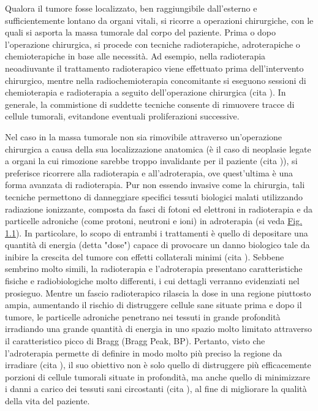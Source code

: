 \documentclass[12pt,a4paper,twoside]{report}
\begin{document}
	Qualora il tumore fosse localizzato, ben raggiungibile dall'esterno e sufficientemente lontano da organi vitali, si ricorre a operazioni chirurgiche, con le quali si asporta la massa tumorale dal corpo del paziente. Prima o dopo l'operazione chirurgica, si procede con tecniche radioterapiche, adroterapiche o chemioterapiche in base alle necessità. Ad esempio, nella radioterapia neoadiuvante il trattamento radioterapico viene effettuato prima dell'intervento chirurgico, mentre nella radiochemioterapia concomitante si eseguono sessioni di chemioterapia e radioterapia a seguito dell'operazione chirurgica (cita
	). In generale, la commistione di suddette tecniche consente di rimuovere tracce di cellule tumorali, evitandone eventuali proliferazioni successive.
	
	Nel caso in la massa tumorale non sia rimovibile attraverso un'operazione chirurgica a causa della sua localizzazione anatomica (è il caso di neoplasie legate a organi la cui rimozione sarebbe troppo invalidante per il paziente (cita
	)), si preferisce ricorrere alla radioterapia e all'adroterapia, ove quest'ultima è una forma avanzata di radioterapia. Pur non essendo invasive come la chirurgia, tali tecniche permettono di danneggiare specifici tessuti biologici malati utilizzando radiazione ionizzante, composta da fasci di fotoni ed elettroni in radioterapia e da particelle adroniche (come protoni, neutroni e ioni) in adroterapia (si veda \hyperref[fig:simulation]{Fig. 1.1}). In particolare, lo scopo di entrambi i trattamenti è quello di depositare una quantità di energia (detta "dose") capace di provocare un danno biologico tale da inibire la crescita del tumore con effetti collaterali minimi (cita
	). Sebbene sembrino molto simili, la radioterapia e l'adroterapia presentano caratteristiche fisiche e radiobiologiche molto differenti, i cui dettagli verranno evidenziati nel prosieguo. Mentre un fascio radioterapico rilascia la dose in una regione piuttosto ampia, aumentando il rischio di distruggere cellule sane situate prima e dopo il tumore, le particelle adroniche penetrano nei tessuti in grande profondità irradiando una grande quantità di energia in uno spazio molto limitato attraverso il caratteristico picco di Bragg (Bragg Peak, BP). Pertanto, visto che l'adroterapia permette di definire in modo molto più preciso la regione da irradiare (cita
	), il suo obiettivo non è solo quello di distruggere più efficacemente porzioni di cellule tumorali situate in profondità, ma anche quello di minimizzare i danni a carico dei tessuti sani circostanti (cita
	), al fine di migliorare la qualità della vita del paziente.
	
\end{document}
